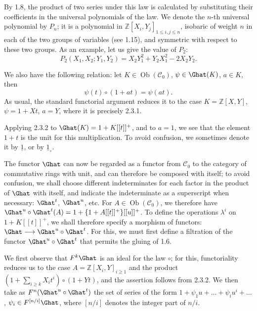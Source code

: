 By 1.8, the product of two series under this law is calculated by substituting their coefficients in the universal polynomials of the law. We denote the \(n\)-th universal polynomial by \(P_n\); it is a polynomial in \(\mathbb Z[X_i,Y_j]_{1\leq i,j\leq n}\), isobaric of weight \(n\) in each of the two groups of variables (see 1.15), and symmetric with respect to these two groups. As an example, let us give the value of \(P_2\):
\[
  P_2(X_1,X_2;Y_1,Y_2)=X_2Y_1^2+Y_2X_1^2-2X_2Y_2.
\]

We also have the following relation: let \(K\in\operatorname{Ob}(\mathcal C_0)\), \(\psi\in\Ghat(K)\), \(a\in K\), then
\begin{equation}\tag{2.3.2}
  \psi(t)\circ(1+at)=\psi(at).
\end{equation}
As usual, the standard functorial argument reduces it to the case \(K=\mathbb Z[X,Y]\), \(\psi=1+Xt\), \(a=Y\), where it is precisely 2.3.1.

Applying 2.3.2 to \(\Ghat(K)=1+K[[t]]^+\), and to \(a=1\), we see that the element \(1+t\) is the unit for this multiplication. To avoid confusion, we sometimes denote it by \(\underline{1}\), or by \(\underline{1}_\circ\).

The functor \(\Ghat\) can now be regarded as a functor from \(\mathcal C_0\) to the category of commutative rings with unit, and can therefore be composed with itself; to avoid confusion,
we
%
shall choose different indeterminates for each factor in the product of \(\Ghat\) with itself, and indicate the indeterminate as a superscript when necessary: \(\Ghat^t\), \(\Ghat^u\), etc. For \(A\in\operatorname{Ob}(\mathcal C_0)\), we therefore have \(\Ghat^u\circ\Ghat^t(A)=1+\{1+A[[t]]^+\}[[u]]^+\). To define the operations \(\lambda^i\) on \(1+K[[t]]^+\), we shall therefore specify a morphism of functors: \(\Ghat\longrightarrow\Ghat^u\circ\Ghat^t\).
For this, we must first define a filtration of the functor \(\Ghat^u\circ\Ghat^t\) that permits the gluing of 1.6.

We first observe that \(F^k\Ghat\) is an ideal for the law \(\circ\); for this, functoriality reduces us to the case \(A=\mathbb Z[X_i,Y]_{i\geq1}\) and the product \(\left(1+\sum_{i\geq k}X_i t^i\right)\circ(1+Yt)\), and the assertion follows from 2.3.2. We then take as \(F^n(\Ghat^u\circ\Ghat^t)\) the set of series of the form \(1+\psi_1u+\ldots+\psi_i u^i+\ldots\), \(\psi_i\in F^{[n/i]}\Ghat\), where \([n/i]\) denotes the integer part of \(n/i\).


